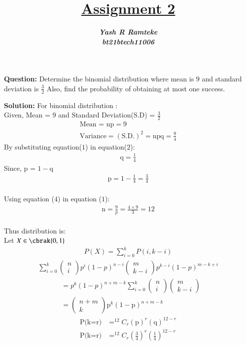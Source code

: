 \documentclass[journal,12pt,twocolumn]{IEEEtran}
\title{\textbf{\underline{Assignment 2}}}
\author{\textbf{\textit{Yash R Ramteke}}\\
\textbf{\textit{bt21btech11006}}}
\begin{document}
\maketitle

\textbf{Question:}
Determine the binomial distribution where mean is $9$ and standard deviation is $\frac{3}{2}$ Also, find the probability of obtaining at most one success.

\bigskip
\textbf{Solution:}
For binomial distribution :\\
Given, Mean = $9$ and Standard Deviation(S.D) = $\frac{3}{2}$
\begin{align}
    \text{Mean = np} = 9
    \\
    \text{Variance} = (\text{S.D.})^{2} = \text{npq} = \frac{9}{4}
\end{align}
By substituting equation($1$) in equation($2$):
\begin{align}
      \text{q} = \frac{1}{4}
\end{align}
Since, p = $1 -$q
\begin{align}
      \text{p} = 1 - \frac{1}{4} = \frac{3}{4} 
\end{align}\\
Using equation ($4$) in equation ($1$):
\begin{align}
      \text{n} = \frac{9}{p} = \frac{4\times9}{3} = 12
\end{align}\\
Thus distribution is:\\
Let $X\in \cbrak{0,1}$\\
\begin{align}
 P(X) = \sum_{i=0}^{k}P(i,k-i)
\end{align}
\begin{align}
\sum_{i=0}^{k}\left(\begin{array}{ll}
    n\\
    i
    \end{array}\right){p}^i(1-p)^{n-i} \left(\begin{array}{ll}
    m\\
    k-i
    \end{array}\right)p^{k-i}(1-p)^{m-k+i}
\end{align}
\begin{align}
    &= p^k(1-p)^{n+m-k}\sum_{i=0}^{k}\left(\begin{array}{cc}
    n\\
    i
    \end{array}\right)\left(\begin{array}{ll}
    m\\
    k-i
    \end{array}\right)\\
&= \left(\begin{array}{cc}
    n+m\\
    k
    \end{array}\right) \text{p}^k \left(1-\text{p}\right)^{n+m-k}
\end{align}
\begin{align}
\text{P(k=r)} &= ^{12}C_r (\text{p})^r (\text{q})^{12-r}\\
\text{P(k=r)} &= ^{12}C_r \left(\frac{3}{4}\right)^r \left(\frac{1}{4}\right)^{12-r}
\end{align}
\end{document}
